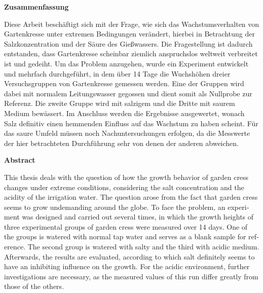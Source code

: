 \label{sec:abstract}
    \begin{center}
      \textbf{Zusammenfassung}
    \end{center}
    Diese Arbeit beschäftigt sich mit der Frage, wie sich das Wachstumsverhalten von Gartenkresse unter extremen Bedingungen verändert, hierbei in Betrachtung der Salzkonzentration und der Säure des Gießwassers. Die Fragestellung ist dadurch entstanden, dass Gartenkresse scheinbar ziemlich anspruchslos weltweit verbreitet ist und gedeiht. Um das Problem anzugehen, wurde ein Experiment entwickelt und mehrfach durchgeführt, in dem über 14 Tage die Wuchshöhen dreier Versuchsgruppen von Gartenkresse gemessen werden. Eine der Gruppen wird dabei mit normalem Leitungswasser gegossen und dient somit als Nullprobe zur Referenz. Die zweite Gruppe wird mit salzigem und die Dritte mit saurem Medium bewässert. Im Anschluss werden die Ergebnisse ausgewertet, wonach Salz definitiv einen hemmenden Einfluss auf das Wachstum zu haben scheint. Für das saure Umfeld müssen noch Nachuntersuchungen erfolgen, da die Messwerte der hier betrachteten Durchführung sehr von denen der anderen abweichen.
\vspace{4em}
    \begin{otherlanguage}{english}
        \begin{center}
          \textbf{Abstract}
        \end{center}
        This thesis deals with the question of how the growth behavior of garden cress changes under extreme conditions, considering the salt concentration and the acidity of the irrigation water. The question arose from the fact that garden cress seems to grow undemanding around the globe. To face the problem, an experiment was designed and carried out several times, in which the growth heights of three experimental groups of garden cress were measured over 14 days. One of the groups is watered with normal tap water and serves as a blank sample for reference. The second group is watered with salty and the third with acidic medium. Afterwards, the results are evaluated, according to which salt definitely seems to have an inhibiting influence on the growth. For the acidic environment, further investigations are necessary, as the measured values of this run differ greatly from those of the others.
    \end{otherlanguage}